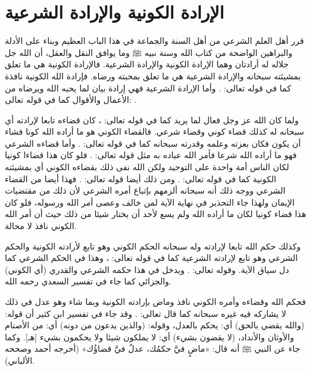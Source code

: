 \section{الإرادة الكونية والإرادة الشرعية}

قرر أهل العلم الشرعي من أهل السنة والجماعة في هذا الباب العظيم وبناء على الأدلة والبراهين الواضحة من كتاب الله وسنة نبيه ﷺ وما يوافق النقل والعقل، أن الله جل جلاله له أرادتان وهما الإرادة الكونية والإرادة الشرعية. فالإرادة الكونية هي ما تعلق بمشيئته سبحانه والإرادة الشرعية هي ما تعلق بمحبته ورضاه. فإرادة الله الكونية نافذة كما في قوله تعالى:
\quranayah*[36][82]{\footnotesize \surahname*[36]}. وأما الإرادة الشرعية فهي إرادة بيان لما يحبه الله ويرضاه من الأعمال والأقوال كما في قوله تعالى:
\quranayah*[4][26-28]{\footnotesize \surahname*[4]}.

ولما كان الله عز وجل فعال لما يريد كما في قوله تعالى:
\quranayah*[85][16]{\footnotesize \surahname*[16]}، كان قضاءه تابعا لإرادته أي سبحانه له كذلك قضاء كوني وقضاء شرعي. فالقضاء الكوني هو ما أراده الله كونا فشاء أن يكون فكان بعزته وعلمه وقدرته سبحانه كما في قوله تعالى:
\quranayah*[2][117]{\footnotesize \surahname*[2]}. %
وأما قضاءه الشرعي فهو ما أراده الله شرعا فأمر الله عباده به مثل قوله تعالى:
\quranayah*[17][23]{\footnotesize \surahname*[17]}. فلو كان هذا قضاءا كونيا لكان الناس أمة واحدة على التوحيد ولكن الله نفى ذلك بقضاءه الكوني أي بمشيئته الكونية كما في قوله تعالى: \quranayah*[16][93]{\footnotesize \surahname*[16]}.
ومن ذلك أيضا قوله تعالى:
\quranayah*[33][36]{\footnotesize \surahname*[33]}. فهذا أيضا من القضاء الشرعي ووجه ذلك أنه سبحانه ألزمهم بإتباع أمره الشرعي لأن ذلك من مقتضيات الإيمان ولهذا جاء التحذير في نهاية الآية لمن خالف وعصى أمر الله ورسوله، فلو كان هذا قضاء كونيا لكان ما أراده الله ولم يسع لأحد أن يختار شيئا من ذلك حيث أن أمر الله الكوني نافذ لا محالة.

وكذلك حكم الله تابعا لإرادته وله سبحانه الحكم الكوني وهو تابع لأرادته الكونية والحكم الشرعي وهو تابع لإرادته الشرعية كما في قوله تعالى:
\quranayah*[5][1]{\footnotesize \surahname*[5]}، وهذا في الحكم الشرعي كما دل سياق الآية. وقوله تعالى:
\quranayah*[13][41]{\footnotesize \surahname*[13]}. ويدخل في هذا حكمه الشرعي والقدري (أي الكوني) والجزائي كما جاء في تفسير السعدي رحمه الله.

فحكم الله وقضاءه وأمره الكوني نافذ وماض بإرادته الكونية وبما شاء وهو عدل في ذلك لا يشاركه فيه غيره سبحانه كما قال تعالى:
\quranayah*[40][20]{\footnotesize \surahname*[40]}. وقد جاء في تفسير ابن كثير أن قوله: (والله يقضي بالحق) أي: يحكم بالعدل، وقوله: (والذين يدعون من دونه) أي: من الأصنام والأوثان والأنداد، (لا يقضون بشيء) أي: لا يملكون شيئا ولا يحكمون بشيء [هـ]. وكما جاء عن النبي ﷺ أنه قال:
«ماضٍ فيَّ حكمُك، عدلٌ فيَّ قضاؤُك» {\footnotesize (أخرجه أحمد وصححه الألباني)}. 

